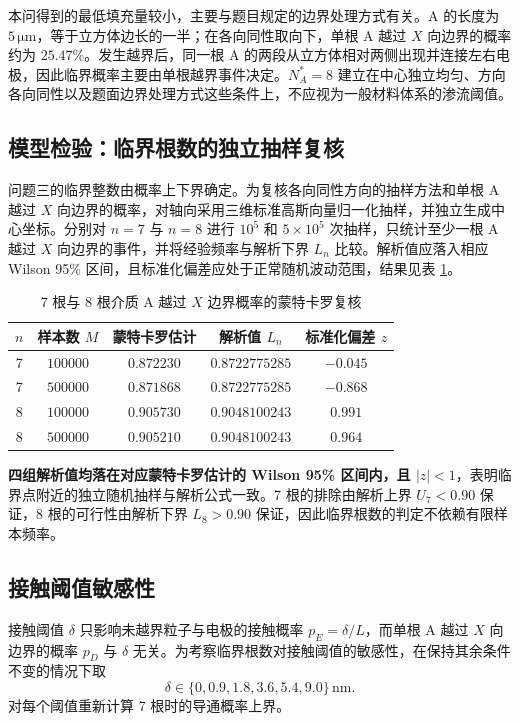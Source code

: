 \documentclass[withoutpreface,bwprint]{cumcmthesis}
\begin{document}
本问得到的最低填充量较小，主要与题目规定的边界处理方式有关。A 的长度为 $5\,\mathrm{\mu m}$，等于立方体边长的一半；在各向同性取向下，单根 A 越过 $X$ 向边界的概率约为 $25.47\%$。发生越界后，同一根 A 的两段从立方体相对两侧出现并连接左右电极，因此临界概率主要由单根越界事件决定。$N_A^*=8$ 建立在中心独立均匀、方向各向同性以及题面边界处理方式这些条件上，不应视为一般材料体系的渗流阈值。
\subsection{模型检验：临界根数的独立抽样复核}

问题三的临界整数由概率上下界确定。为复核各向同性方向的抽样方法和单根 A 越过 $X$ 向边界的概率，对轴向采用三维标准高斯向量归一化抽样，并独立生成中心坐标。分别对 $n=7$ 与 $n=8$ 进行 $10^5$ 和 $5\times10^5$ 次抽样，只统计至少一根 A 越过 $X$ 向边界的事件，并将经验频率与解析下界 $L_n$ 比较。解析值应落入相应 Wilson 95\% 区间，且标准化偏差应处于正常随机波动范围，结果见表 \ref{tab:q3-mc-check}。

\begin{table}[H]
\centering
\caption{7 根与 8 根介质 A 越过 $X$ 边界概率的蒙特卡罗复核}
\label{tab:q3-mc-check}
\begin{tabular}{ccccc}
\toprule
$n$ & 样本数 $M$ & 蒙特卡罗估计 & 解析值 $L_n$ & 标准化偏差 $z$ \\
\midrule
7 & $100000$ & $0.872230$ & $0.8722775285$ & $-0.045$ \\
7 & $500000$ & $0.871868$ & $0.8722775285$ & $-0.868$ \\
8 & $100000$ & $0.905730$ & $0.9048100243$ & $0.991$ \\
8 & $500000$ & $0.905210$ & $0.9048100243$ & $0.964$ \\
\bottomrule
\end{tabular}
\end{table}

\textbf{四组解析值均落在对应蒙特卡罗估计的 Wilson 95\% 区间内，且 $|z|<1$}，表明临界点附近的独立随机抽样与解析公式一致。7 根的排除由解析上界 $U_7<0.90$ 保证，8 根的可行性由解析下界 $L_8>0.90$ 保证，因此临界根数的判定不依赖有限样本频率。

\subsection{接触阈值敏感性}

接触阈值 $\delta$ 只影响未越界粒子与电极的接触概率 $p_E=\delta/L$，而单根 A 越过 $X$ 向边界的概率 $p_D$ 与 $\delta$ 无关。为考察临界根数对接触阈值的敏感性，在保持其余条件不变的情况下取
\[
\delta\in\{0,0.9,1.8,3.6,5.4,9.0\}\,\mathrm{nm}.
\]
对每个阈值重新计算 7 根时的导通概率上界。
\end{document}
